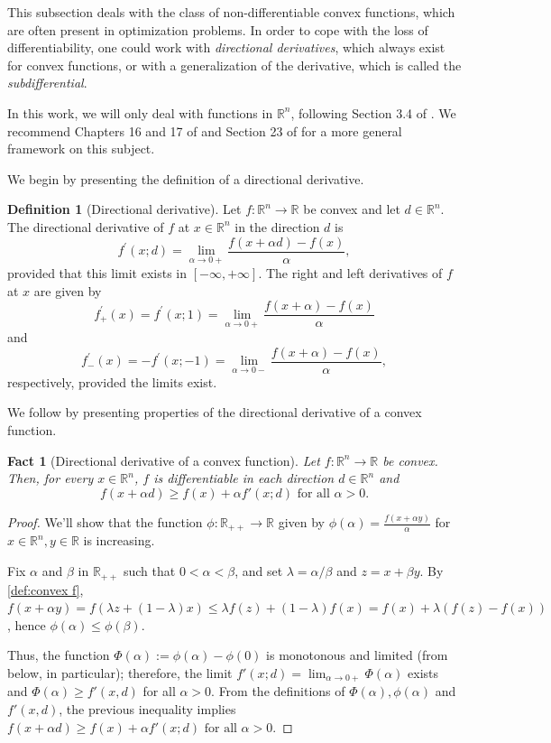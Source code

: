 \documentclass[smallextended,numbook,nospthms]{svjour3}
\theoremstyle{plain}
\newtheorem{fact}[theorem]{Fact}
\theoremstyle{definition}
\newtheorem{definition}[theorem]{Definition}
\def\RR{\mathds R}
\begin{document}
This subsection deals with the class of non-differentiable convex functions, which are often present in optimization problems. In order to cope with the loss of differentiability, one could work with \emph{directional derivatives}, which always exist for convex functions, or with a generalization of the derivative, which is called the \emph{subdifferential}.

In this work, we will only deal with functions in $\RR^n$, following Section 3.4 of \cite{Izmailov:2014}. We recommend Chapters 16 and 17 of \cite{BC2011} and Section 23 of \cite{Rockafellar:1996} for a more general framework on this subject.

We begin by presenting the definition of a directional derivative.
\begin{definition}[Directional derivative]\label{def:dir deriv}
Let $f: \RR^n \rightarrow \RR$ be convex and let $d \in \RR^n$. The directional derivative of $f$ at $x \in \RR^n$ in the direction $d$ is
$$
f^{\prime}(x;d)=\lim _{\alpha \rightarrow 0+} \frac{f(x+\alpha d)-f(x)}{\alpha},
$$
provided that this limit exists in $[-\infty,+\infty]$. 
The right and left derivatives of $f$ at $x$ are given by
$$
f_{+}^{\prime}(x)=f^{\prime}(x ; 1)=\lim _{\alpha \rightarrow 0+} \frac{f(x+\alpha)-f(x)}{\alpha}
$$
and
$$
f_{-}^{\prime}(x)=-f^{\prime}(x ;-1)=\lim _{\alpha \rightarrow 0-} \frac{f(x+\alpha)-f(x)}{\alpha},
$$
respectively, provided the limits exist.	
\end{definition}

We follow by presenting properties of the directional derivative of a convex function.
\begin{fact}[Directional derivative of a convex function]\label{fact:dir deriv conv}
Let $f: \RR^n \rightarrow \RR$ be convex. Then, for every $x \in \RR^n$, $f$ is differentiable in each direction $d \in \RR^n$ and
\[
f(x+\alpha d) \geq f(x) + \alpha f'(x;d) \text{ for all } \alpha>0.
\]
\end{fact}
\begin{proof}
	We'll show that the function $\phi:\RR_{++} \rightarrow \RR$ given by $\phi(\alpha)=\frac{f(x+\alpha y)}{\alpha}$ for $x \in \RR^n, y \in \RR$ is increasing.
	
	Fix $\alpha$ and $\beta$ in $\RR_{++}$ such that $0<\alpha<\beta$, and set $\lambda=\alpha / \beta$ and $z=x+\beta y$. By \cref{def:convex f}, $f(x+\alpha y)=f(\lambda z+(1-\lambda) x) \leqslant \lambda f(z)+(1-\lambda) f(x)=f(x)+\lambda(f(z)-f(x))$,	hence $\phi(\alpha) \leqslant \phi(\beta)$.
	
	Thus, the function $\Phi(\alpha):=\phi(\alpha)-\phi(0)$ is monotonous and limited (from below, in particular); therefore, the limit $f'(x;d)=\lim _{\alpha \rightarrow 0+} \Phi(\alpha)$ exists and
	$\Phi(\alpha) \geq f'(x,d)$ for all $\alpha > 0$. From the definitions of $\Phi(\alpha), \phi(\alpha)$ and $f'(x,d)$, the previous inequality implies $f(x+\alpha d) \geq f(x) + \alpha f'(x;d) \text{ for all } \alpha>0$.
\end{proof}
\end{document}
